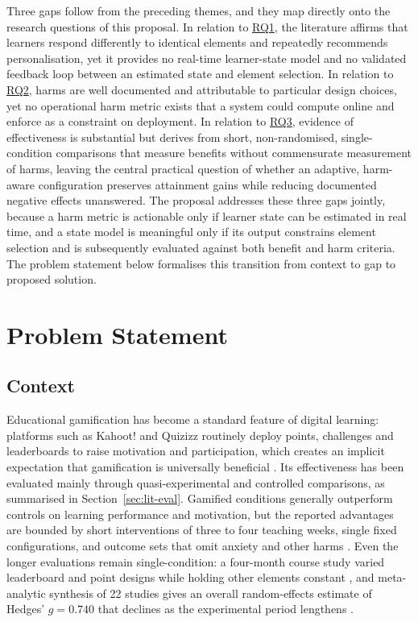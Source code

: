 \documentclass[12pt,a4paper]{article}
\DeclareRobustCommand{\rqlink}[1]{\texorpdfstring{\hyperref[rq:rq#1]{RQ#1}}{RQ#1}}
\begin{document}
\begin{justify}
Three gaps follow from the preceding themes, and they map directly onto the research questions of this proposal. In relation to \rqlink{1}, the literature affirms that learners respond differently to identical elements and repeatedly recommends personalisation, yet it provides no real-time learner-state model and no validated feedback loop between an estimated state and element selection. In relation to \rqlink{2}, harms are well documented and attributable to particular design choices, yet no operational harm metric exists that a system could compute online and enforce as a constraint on deployment. In relation to \rqlink{3}, evidence of effectiveness is substantial but derives from short, non-randomised, single-condition comparisons that measure benefits without commensurate measurement of harms, leaving the central practical question of whether an adaptive, harm-aware configuration preserves attainment gains while reducing documented negative effects unanswered. The proposal addresses these three gaps jointly, because a harm metric is actionable only if learner state can be estimated in real time, and a state model is meaningful only if its output constrains element selection and is subsequently evaluated against both benefit and harm criteria. The problem statement below formalises this transition from context to gap to proposed solution.



\section{Problem Statement}

\subsection{Context}

Educational gamification has become a standard feature of digital learning: platforms
such as Kahoot! and Quizizz routinely deploy points, challenges and leaderboards to
raise motivation and participation, which creates an implicit expectation that
gamification is universally beneficial \parencite{nugroho2025negative}. Its
effectiveness has been evaluated mainly through quasi-experimental and controlled
comparisons, as summarised in Section~\ref{sec:lit-eval}. Gamified conditions
generally outperform controls on learning performance and motivation, but the
reported advantages are bounded by short interventions of three to four teaching
weeks, single fixed configurations, and outcome sets that omit anxiety and other
harms \parencite{zhang2026gamification,ojonuba2025web,ming2025gamification}. Even the
longer evaluations remain single-condition: a four-month course study varied
leaderboard and point designs while holding other elements constant
\parencite{durmaz2022gamification}, and meta-analytic synthesis of 22 studies gives an
overall random-effects estimate of Hedges' $g=0.740$ that declines as the
experimental period lengthens \parencite{lu2024ai}.


\end{justify}
\end{document}
